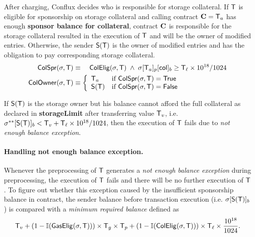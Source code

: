 After charging, Conflux decides who is responsible for storage collateral. If $\textsf{T}$ is eligible for sponsorship on storage collateral and calling contract $\mathbf{C}=\textsf{T}_a$ has enough \textbf{sponsor balance for collateral}, contract $\mathbf{C}$ is responsible for the storage collateral resulted in the execution of $\textsf{T}$ and will be the owner of modified entries. 
%
Otherwise, the sender $\mathsf{S}{\left({\textsf{T}} \right)}$ is the owner of modified entries
and has the obligation to pay corresponding storage collateral. 
%
\begin{align}
	\mathsf{ColSpr}(\mathbf{\sigma},\textsf{T}) &\equiv\quad  \mathsf{ColElig}(\mathbf{\sigma},\textsf{T}) \;\wedge\; \mathbf{\sigma}[\textsf{T}_a]_p[{\sf col}]_b\ge \textsf{T}_\ell\times 10^{18}/1024 \\
	\mathsf{ColOwner}(\mathbf{\sigma},\textsf{T}) &\equiv\left\{ \begin{array}{ll}
		\textsf{T}_a & \text{if } \mathsf{ColSpr}(\mathbf{\sigma},\textsf{T}) = \mathsf{True} \\ 
		\mathsf{S}{\left({\textsf{T}} \right)} & \text{if } \mathsf{ColSpr}(\mathbf{\sigma},\textsf{T}) = \mathsf{False} \\ 
	\end{array}\right.
\end{align}

If $\mathsf{S}{\left({\textsf{T}} \right)}$ is the storage owner but his balance cannot afford the full collateral as declared in {\bf storageLimit} after transferring value $\textsf{T}_v$, 
i.e. $\mathbf{\sigma}^{**}[\mathsf{S}{\left({\textsf{T}} \right)}]_b<\textsf{T}_v+\textsf{T}_\ell\times 10^{18}/1024$, 
then the execution of $\textsf{T}$ fails due to \emph{not enough balance exception}. 

\paragraph{Handling not enough balance exception.} 

Whenever the preprocessing of $\textsf{T}$ generates a \emph{not enough balance exception} during preprocessing, the execution of $\textsf{T}$ fails and there will be no further execution of $\textsf{T}$. To figure out whether this exception caused by the insufficient sponsorship balance in contract, the sender balance before transaction execution (i.e. $\mathbf{\sigma}[\mathsf{S}{\left({\textsf{T}} \right)}]_b$) is compared with a \emph{minimum required balance} defined as
\begin{align}
	\textsf{T}_v+(1-\mathbb{I}(\mathsf{GasElig}(\mathbf{\sigma},\textsf{T})))\times \textsf{T}_g \times \textsf{T}_p + (1-\mathbb{I}(\mathsf{ColElig}(\mathbf{\sigma},\textsf{T})))\times \textsf{T}_\ell \times \frac{10^{18}}{1024}.
\end{align}

